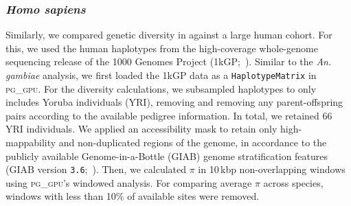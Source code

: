 \subsubsection*{\textit{Homo sapiens}}

Similarly, we compared genetic diversity in \bgla{} against a large human cohort.
For this, we used the human haplotypes from the high-coverage whole-genome sequencing
release of the 1000 Genomes Project (1kGP;~\citealp{hg1kg_nygc}).
Similar to the \textit{An. gambiae} analysis, we first loaded the 1kGP data as a
\texttt{HaplotypeMatrix} in \textsc{pg\_gpu}.
For the diversity calculations, we subsampled haplotypes to only includes Yoruba individuals (YRI),
removing and removing any parent-offspring pairs according to the available pedigree information.
In total, we retained 66 YRI individuals.
We applied an accessibility mask to retain only high-mappability and non-duplicated regions of the
genome, in accordance to the publicly available Genome-in-a-Bottle (GIAB) genome stratification
features (GIAB version \texttt{3.6};~\citealp{dwarshuis_giab_2024}).
Then, we calculated $\pi$ in 10\,kbp non-overlapping windows using \textsc{pg\_gpu}'s windowed
analysis.
For comparing average $\pi$ across species, windows with less than 10\% of available sites were removed.
